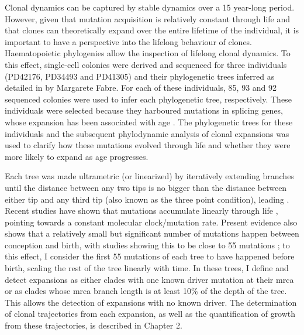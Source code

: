 Clonal dynamics can be captured by stable dynamics over a 15 year-long period.  However, given that mutation acquisition is relatively constant through life \cite{Abascal_2021_gjvqfm} and that clones can theoretically expand over the entire lifetime of the individual, it is important to have a perspective into the lifelong behaviour of clones. Haematopoietic phylogenies allow the inspection of lifelong clonal dynamics. To this effect, single-cell colonies were derived and sequenced for three individuals (PD42176, PD34493 and PD41305) and their phylogenetic trees inferred as detailed in \cite{Fabre2021-uw} by Margarete Fabre. For each of these individuals, 85, 93 and 92 sequenced colonies were used to infer each phylogenetic tree, respectively. These individuals were selected because they harboured mutations in splicing genes, whose expansion has been associated with age \cite{McKerrell2015-rl}. The phylogenetic trees for these individuals and the subsequent phylodynamic analysis of clonal expansions was used to clarify how these mutations evolved through life and whether they were more likely to expand as age progresses.

Each tree was made ultrametric (or linearized) by iteratively extending branches until the distance between any two tips is no bigger than the distance between either tip and any third tip (also known as the three point condition), leading . Recent studies have shown that mutations accumulate linearly through life \cite{Abascal_2021_gjvqfm,Mitchell2021-zl}, pointing towards a constant molecular clock/mutation rate. Present evidence also shows that a relatively small but significant number of mutations happen between conception and birth, with studies showing this to be close to 55 mutations \cite{SpencerChapman_2021_gjz4x4,Mitchell2021-zl}; to this effect, I consider the first 55 mutations of each tree to have happened before birth, scaling the rest of the tree linearly with time. In these trees, I define and detect expansions as either clades with one known driver mutation at their \ac{mrca} or as clades whose \ac{mrca} branch length is at least 10\% of the depth of the tree. This allows the detection of expansions with no known driver. The determination of clonal trajectories from each expansion, as well as the quantification of growth from these trajectories, is described in Chapter 2.

